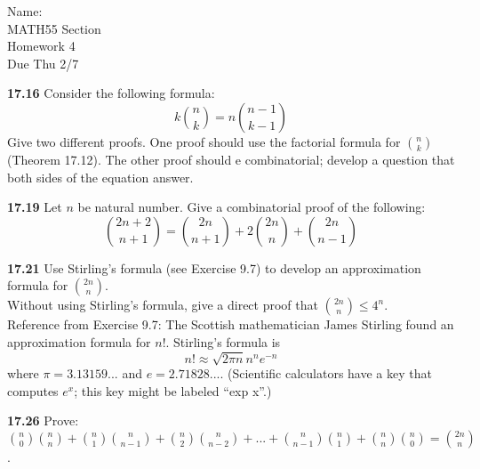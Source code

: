 \documentclass[10pt]{article}
\begin{document}
\begin{flushright}
	Name: \underline{\hspace{3cm}} \\
	MATH55 Section \underline{\hspace{0.5cm}} \\
	Homework 4 \\
	Due Thu 2/7
\end{flushright}

\begin{framed}
    \textbf{17.16} Consider the following formula:
    $$
    k \binom{n}{k} = n\binom{n-1}{k-1}
    $$
    Give two different proofs. One proof should use the factorial formula for $\binom{n}{k}$ 
    (Theorem 17.12). The other proof should e combinatorial; develop a question that both sides of
    the equation answer.
\end{framed}

\pagebreak

\begin{framed}
    \textbf{17.19} Let $n$ be natural number. Give a combinatorial proof of the following:
    $$
    \binom{2n+2}{n+1} = \binom{2n}{n+1} + 2\binom{2n}{n} + \binom{2n}{n-1}
    $$
\end{framed}

\pagebreak

\begin{framed}
    \textbf{17.21} Use Stirling's formula (see Exercise 9.7) to develop an approximation formula for 
    $\binom{2n}{n}$.\\
    Without using Stirling's formula, give a direct proof that $\binom{2n}{n} \leq 4^n$.\\

    Reference from Exercise 9.7: The Scottish mathematician James Stirling found an approximation formula for $n!$.
    Stirling’s formula is
    $$
        n! \approx \sqrt{2\pi n} n^n e^{-n}
    $$
    where $\pi = 3.13159...$ and $e = 2.71828...$. (Scientific calculators have a key that computes $e^x$;
    this key might be labeled ``exp x''.)
\end{framed}

\pagebreak

\begin{framed}
    \textbf{17.26} Prove: $\binom{n}{0}\binom{n}{n} + \binom{n}{1}\binom{n}{n-1} +
    \binom{n}{2}\binom{n}{n-2} + ... + \binom{n}{n-1}\binom{n}{1} + \binom{n}{n}\binom{n}{0} = \binom{2n}{n}$.
\end{framed}
\end{document}
